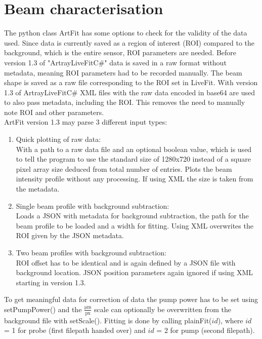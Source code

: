 \documentclass[twoside,openright,listof=numbered]{scrreprt}
\begin{document}
\section{Beam characterisation}\label{sec:pythonBeamCharacterisation}


The python class ArtFit has some options to check for the validity of the data used. Since data is currently saved as a region of interest (ROI) compared to the background, which is the entire sensor, ROI parameters are needed. Before version 1.3 of "ArtrayLiveFitC\#" data is saved in a raw format without metadata, meaning ROI parameters had to be recorded manually.  The beam shape is saved as a raw file corresponding to the ROI set in LiveFit. With version 1.3 of ArtrayLiveFitC\# XML files with the raw data encoded in base64 are used to also pass metadata, including the ROI. This removes the need to manually note ROI and other parameters.\\
ArtFit version 1.3 may parse 3 different input types:
\begin{enumerate}
\item Quick plotting of raw data:\\
With a path to a raw data file and an optional boolean value, which is used to tell the program to use the standard size of 1280x720 instead of a square pixel array size deduced from total number of entries. Plots the beam intensity profile without any processing. If using XML the size is taken from the metadata.
\item Single beam profile with background subtraction: \\
Loads a JSON with metadata for background subtraction, the path for the beam profile to be loaded and a width for fitting. Using XML overwrites the ROI given by the JSON metadata.
\item Two beam profiles with background subtraction: \\
ROI offset has to be identical and is again defined by a JSON file with background location. JSON position parameters again ignored if using XML starting in version 1.3.
\end{enumerate}

To get meaningful data for correction of data the pump power has to be set using setPumpPower() and the $\mathrm{\frac{\si{\micro\meter}}{px}}$ scale can optionally be overwritten from the background file with setScale(). Fitting is done by calling plainFit($id$), where $id$ = 1 for probe (first filepath handed over) and $id$ = 2 for pump (second filepath).
\end{document}
